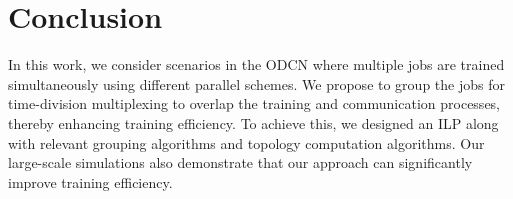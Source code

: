 \documentclass[conference]{IEEEtran}
\begin{document}
\section{Conclusion}

In this work, we consider scenarios in the ODCN where multiple jobs are trained simultaneously using different parallel schemes. We propose to group the jobs for time-division multiplexing to overlap the training and communication processes, thereby enhancing training efficiency. To achieve this, we designed an ILP along with relevant grouping algorithms and topology computation algorithms. Our large-scale simulations also demonstrate that our approach can significantly improve training efficiency.
\end{document}
